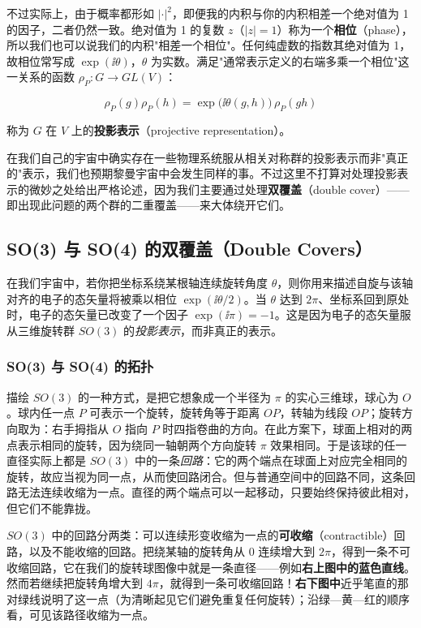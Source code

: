 不过实际上，由于概率都形如 $|\cdot|^{2}$，即便我的内积与你的内积相差一个绝对值为 1 的因子，二者仍然一致。绝对值为 1 的复数 $z$（$|z|=1$）称为一个\textbf{相位}（phase），所以我们也可以说我们的内积"相差一个相位"。任何纯虚数的指数其绝对值为 1，故相位常写成 $\exp(\ii\theta)$，$\theta$ 为实数。满足"通常表示定义的右端多乘一个相位"这一关系的函数 $\rho_{P}:G\to GL(V)$：

\[
\rho_{P}(g)\rho_{P}(h)=\exp\bigl(\ii\theta(g,h)\bigr)\,\rho_{P}(gh)
\]

称为 $G$ 在 $V$ 上的\textbf{投影表示}（projective representation）。

在我们自己的宇宙中确实存在一些物理系统服从相关对称群的投影表示而非"真正的"表示，我们也预期黎曼宇宙中会发生同样的事。不过这里不打算对处理投影表示的微妙之处给出严格论述，因为我们主要通过处理\textbf{双覆盖}（double cover）——即出现此问题的两个群的二重覆盖——来大体绕开它们。

\subsection{SO(3) 与 SO(4) 的双覆盖（Double Covers）}

在我们宇宙中，若你把坐标系绕某根轴连续旋转角度 $\theta$，则你用来描述自旋与该轴对齐的电子的态矢量将被乘以相位 $\exp(\ii\theta/2)$。当 $\theta$ 达到 $2\pi$、坐标系回到原处时，电子的态矢量已改变了一个因子 $\exp(\ii\pi)=-1$。这是因为电子的态矢量服从三维旋转群 $SO(3)$ 的\emph{投影表示}，而非真正的表示。

\subsubsection{SO(3) 与 SO(4) 的拓扑}


描绘 $SO(3)$ 的一种方式，是把它想象成一个半径为 $\pi$ 的实心三维球，球心为 $O$。球内任一点 $P$ 可表示一个旋转，旋转角等于距离 $OP$，转轴为线段 $OP$；旋转方向取为：右手拇指从 $O$ 指向 $P$ 时四指卷曲的方向。在此方案下，球面上相对的两点表示相同的旋转，因为绕同一轴朝两个方向旋转 $\pi$ 效果相同。于是该球的任一直径实际上都是 $SO(3)$ 中的一条\emph{回路}：它的两个端点在球面上对应完全相同的旋转，故应当视为同一点，从而使回路闭合。但与普通空间中的回路不同，这条回路无法连续收缩为一点。直径的两个端点可以一起移动，只要始终保持彼此相对，但它们不能靠拢。

$SO(3)$ 中的回路分两类：可以连续形变收缩为一点的\textbf{可收缩}（contractible）回路，以及不能收缩的回路。把绕某轴的旋转角从 0 连续增大到 $2\pi$，得到一条不可收缩回路，它在我们的旋转球图像中就是一条直径——例如\textbf{右上图中的蓝色直线}。然而若继续把旋转角增大到 $4\pi$，就得到一条可收缩回路！\textbf{右下图中}近乎笔直的那对绿线说明了这一点（为清晰起见它们避免重复任何旋转）；沿绿—黄—红的顺序看，可见该路径收缩为一点。

